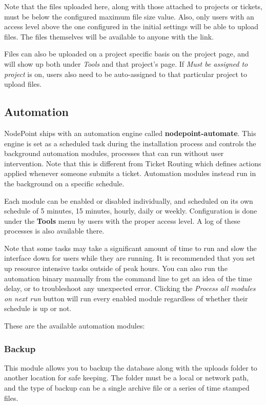 \documentclass[11pt]{article}
\begin{document}
Note that the files uploaded here, along with those attached to projects or tickets, must be below the configured maximum file size value. Also, only users with an access level above the one configured in the initial settings will be able to upload files. The files themselves will be available to anyone with the link.

Files can also be uploaded on a project specific basis on the project page, and will show up both under \textit{Tools} and that project's page.  If \textit{Must be assigned to project} is on, users also need to be auto-assigned to that particular project to upload files.

\subsection{Automation}
NodePoint ships with an automation engine called \textbf{nodepoint-automate}. This engine is set as a scheduled task during the installation process and controls the background automation modules, processes that can run without user intervention. Note that this is different from Ticket Routing which defines actions applied whenever someone submits a ticket. Automation modules instead run in the background on a specific schedule.

Each module can be enabled or disabled individually, and scheduled on its own schedule of 5 minutes, 15 minutes, hourly, daily or weekly. Configuration is done under the \textbf{Tools} menu by users with the proper access level. A log of these processes is also available there.

Note that some tasks may take a significant amount of time to run and slow the interface down for users while they are running. It is recommended that you set up resource intensive tasks outside of peak hours. You can also run the automation binary manually from the command line to get an idea of the time delay, or to troubleshoot any unexpected error. Clicking the \textit{Process all modules on next run} button will run every enabled module regardless of whether their schedule is up or not.

These are the available automation modules:

\subsubsection{Backup}
This module allows you to backup the database along with the uploads folder to another location for safe keeping. The folder must be a local or network path, and the type of backup can be a single archive file or a series of time stamped files.
\end{document}
